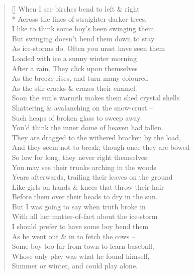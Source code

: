 \documentclass[MAIN]{subfiles}
\begin{document}
\settowidth{\versewidth}{And they seem not to break; though once they are bowed}
\begin{verse}[\versewidth]
When I see birches bend to left \& right\\*
Across the lines of straighter darker trees,\\
I like to think some boy's been swinging them.\\
But swinging doesn't bend them down to stay\\
As ice-storms do. Often you must have seen them\\
Loaded with ice a sunny winter morning\\
After a rain. They click upon themselves\\
As the breeze rises, and turn many-coloured\\
As the stir cracks \& crazes their enamel.\\
Soon the sun's warmth makes them shed crystal shells\\
Shattering \& avalanching on the snow-crust --\\
Such heaps of broken glass to sweep away\\
You'd think the inner dome of heaven had fallen.\\
They are dragged to the withered bracken by the load,\\
And they seem not to break; though once they are bowed\\
So low for long, they never right themselves:\\
You may see their trunks arching in the woods\\
Years afterwards, trailing their leaves on the ground\\
Like girls on hands \& knees that throw their hair\\
Before them over their heads to dry in the sun.\\
But I was going to say when truth broke in\\
With all her matter-of-fact about the ice-storm\\
I should prefer to have some boy bend them\\
As he went out \& in to fetch the cows --\\
Some boy too far from town to learn baseball,\\
Whose only play was what he found himself,\\
Summer or winter, and could play alone.\\

\end{verse}
\end{document}

